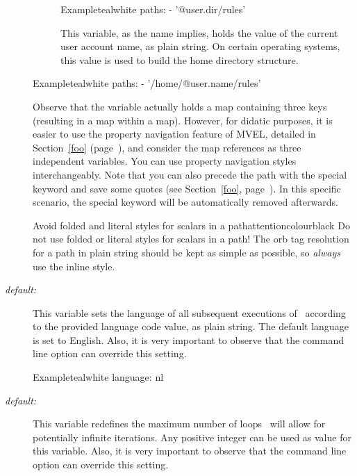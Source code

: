 \begin{description}
\begin{description}
\begin{codebox}{Example}{teal}{\icnote}{white}
paths:
- '@{user.dir}/rules'
\end{codebox}

\item[\varbox{user.name}] This variable, as the name implies, holds the value of the current user account name, as plain string. On certain operating systems, this value is used to build the home directory structure.
\end{description}

\begin{codebox}{Example}{teal}{\icnote}{white}
paths:
- '/home/@{user.name}/rules'
\end{codebox}

Observe that the  variable actually holds a map containing three keys (resulting in a map within a map). However, for didatic purposes, it is easier to use the property navigation feature of MVEL, detailed in Section~\ref{foo} (page~\pageref{foo}), and consider the map references as three independent variables. You can use property navigation styles interchangeably. Note that you can also precede the path with the special keyword  and save some quotes (see Section~\ref{foo}, page~\pageref{foo}). In this specific scenario, the special keyword will be automatically removed afterwards.

\begin{messagebox}{Avoid folded and literal styles for scalars in a path}{attentioncolour}{\icattention}{black}
Do not use folded or literal styles for scalars in a path! The orb tag resolution for a path in plain string should be kept as simple as possible, so \emph{always} use the inline style.
\end{messagebox}

\item[\describecf{O}{string}{language}\hfill {\normalfont\itshape default:} \rbox{en}] This variable sets the language of all subsequent executions of \arara\ according to the provided language code value, as plain string. The default language is set to English. Also, it is very important to observe that the  command line option can override this setting.

\begin{codebox}{Example}{teal}{\icnote}{white}
language: nl
\end{codebox}

\item[\describecf{O}{integer}{loops}\hfill {\normalfont\itshape default:} \rbox{10}] This variable redefines the maximum number of loops \arara\ will allow for potentially infinite iterations. Any positive integer can be used as value for this variable. Also, it is very important to observe that the  command line option can override this setting.


\end{description}
